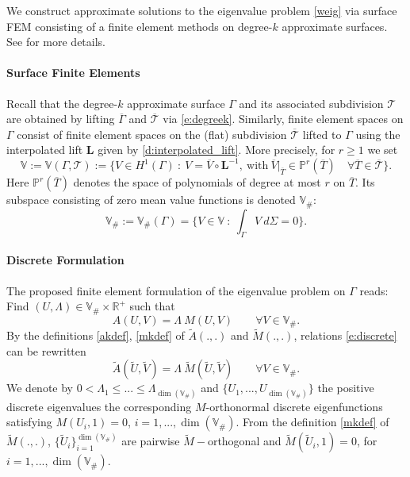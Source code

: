 \documentclass{siamart0516}
\newcommand{\bL}{\ensuremath{\boldsymbol L}}
\numberwithin{equation}{section}
\numberwithin{theorem}{section}
\numberwithin{figure}{section}
\begin{document}
We construct approximate solutions to the eigenvalue problem \eqref{weig} via surface FEM consisting of a finite element methods on degree-$k$ approximate surfaces. See \cite{D09, Dziuk} for more details.

\paragraph{Surface Finite Elements}
Recall that the degree-$k$ approximate surface $\Gamma$ and its associated subdivision $\mathcal T$ are obtained by lifting $\overline{\Gamma}$ and $\overline{\mathcal T}$ via \eqref{e:degreek}.
Similarly, finite element spaces on $\Gamma$ consist of finite element spaces on the (flat) subdivision  $\overline{\mathcal T}$ lifted to $\Gamma$ using the interpolated lift $\bL$ given by \eqref{d:interpolated_lift}.  More precisely, for $r\geq 1$ we set
\begin{equation}\label{e:fem_base}
\mathbb V:=\mathbb{V}(\Gamma,\mathcal T):= \{V \in H^1(\Gamma) \ : \ V = \overline V \circ \bL^{-1}, \ \textrm{with} \ \overline V|_{\overline{T}} \in \mathbb{P}^r(\overline{T}) \quad   \forall \overline{T} \in \overline{\mathcal{T}} \}.
\end{equation}
Here $\mathbb P^r(\overline{T})$ denotes the space of polynomials of degree at most $r$ on $\overline{T}$. 
Its subspace consisting of zero mean value functions is denoted $\mathbb V_\#$:
$$
\mathbb V_\#:= \mathbb V_\#(\Gamma) = \{V \in \mathbb V \ : \ \int_\Gamma V \ d\Sigma = 0\}.
$$

\paragraph{Discrete Formulation}
The proposed finite element formulation of the eigenvalue problem on $\Gamma$ reads: Find $(U,\Lambda)\in \mathbb V_\# \times \mathbb{R}^+$  such that 
\begin{equation}
\label{e:discrete}
A(U,V) = \Lambda ~ M(U,V)\qquad \forall V\in \mathbb V_\#. 
\end{equation}
By the definitions \eqref{akdef}, \eqref{mkdef} of $\widetilde A(.,.)$ and $\widetilde M(.,.)$, relations \eqref{e:discrete} can be rewritten 
$$
\widetilde A(\tilde U,\tilde V) = \Lambda\ \widetilde M( \tilde U,\tilde V) \qquad  \forall V\in \mathbb V_\#.
$$
We denote by $0<  \Lambda_{1} \le ... \le \Lambda_{\dim (\mathbb{V}_\#)}$ and 
$\{U_{1},..., U_{\dim(\mathbb{V}_\#)} \}$  the positive discrete eigenvalues the corresponding $M$-orthonormal discrete eigenfunctions satisfying $M(U_i,1)=0$, $i=1,...,\dim(\mathbb V_\#)$.  
From the definition \eqref{mkdef} of $\widetilde M(.,.)$, $\{ \tilde U_{i}  \}_{i=1}^{\dim(\mathbb V_\#)}$ are pairwise  $\widetilde M-$orthogonal and $\widetilde M(\tilde U_i,1)=0$, for $i=1,...,\dim(\mathbb V_\#)$.
\end{document}
